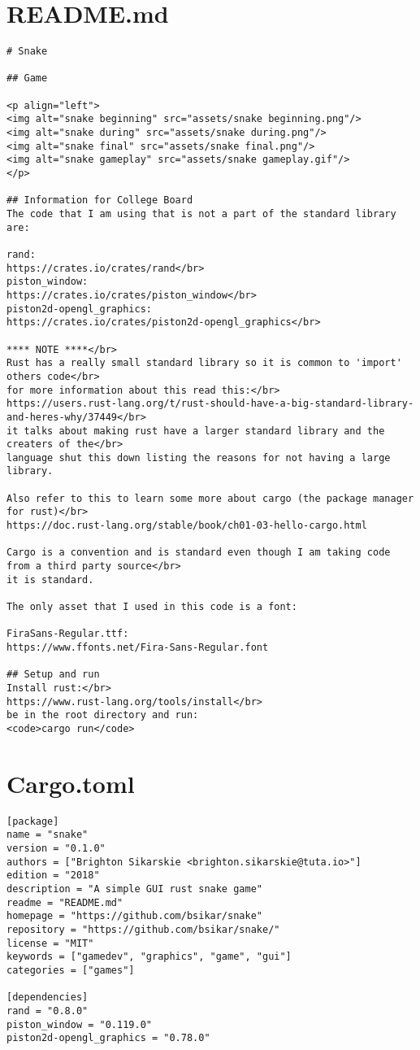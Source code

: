 \documentclass{article}
\begin{document}
\section{README.md}
\begin{verbatim}
# Snake

## Game

<p align="left">
<img alt="snake beginning" src="assets/snake beginning.png"/>
<img alt="snake during" src="assets/snake during.png"/>
<img alt="snake final" src="assets/snake final.png"/>
<img alt="snake gameplay" src="assets/snake gameplay.gif"/>
</p>

## Information for College Board
The code that I am using that is not a part of the standard library are:

rand:
https://crates.io/crates/rand</br>
piston_window:
https://crates.io/crates/piston_window</br>
piston2d-opengl_graphics:
https://crates.io/crates/piston2d-opengl_graphics</br>

**** NOTE ****</br>
Rust has a really small standard library so it is common to 'import' others code</br>
for more information about this read this:</br>
https://users.rust-lang.org/t/rust-should-have-a-big-standard-library-and-heres-why/37449</br>
it talks about making rust have a larger standard library and the creaters of the</br>
language shut this down listing the reasons for not having a large library.

Also refer to this to learn some more about cargo (the package manager for rust)</br>
https://doc.rust-lang.org/stable/book/ch01-03-hello-cargo.html

Cargo is a convention and is standard even though I am taking code from a third party source</br>
it is standard.

The only asset that I used in this code is a font:

FiraSans-Regular.ttf:
https://www.ffonts.net/Fira-Sans-Regular.font

## Setup and run
Install rust:</br>
https://www.rust-lang.org/tools/install</br>
be in the root directory and run:
<code>cargo run</code>
\end{verbatim}

\section{Cargo.toml}
\begin{verbatim}
[package]
name = "snake"
version = "0.1.0"
authors = ["Brighton Sikarskie <brighton.sikarskie@tuta.io>"]
edition = "2018"
description = "A simple GUI rust snake game"
readme = "README.md"
homepage = "https://github.com/bsikar/snake"
repository = "https://github.com/bsikar/snake/"
license = "MIT"
keywords = ["gamedev", "graphics", "game", "gui"]
categories = ["games"]

[dependencies]
rand = "0.8.0"
piston_window = "0.119.0"
piston2d-opengl_graphics = "0.78.0"
\end{verbatim}
\end{document}
